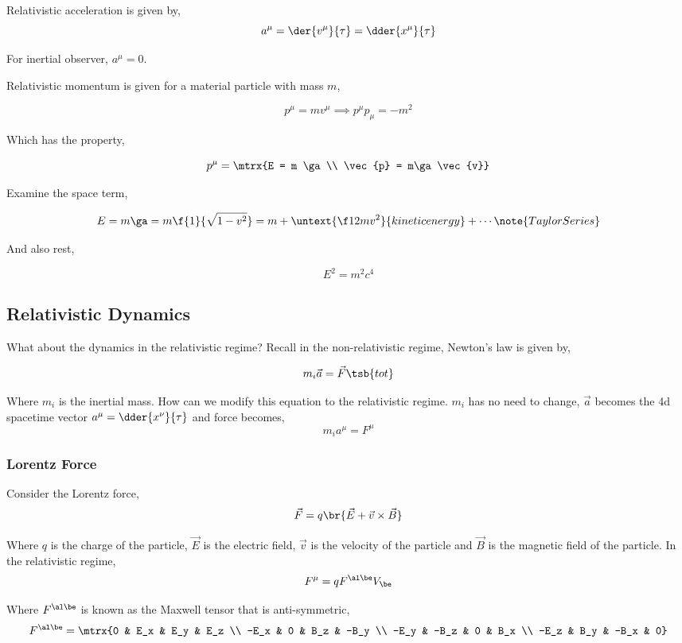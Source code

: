 \documentclass{article}
\begin{document}
Relativistic acceleration is given by,
\[ a^\mu = \der{v^\mu}{\tau} = \dder{x^\mu}{\tau} \]

For inertial observer, $a^\mu = 0$.

Relativistic momentum is given for a material particle with mass $m$,

\[ p^\mu = m v^\mu \implies p^\mu p_\mu = - m^2\]

Which has the property,

\[ p^\mu = \mtrx{E = m \ga \\ \vec{p} = m\ga \vec{v}} \]

Examine the space term,

\[ E = m \ga = m \f{1}{\sqrt{1-v^2}} = m + \untext{\f12 m v^2}{kinetic energy} + \cdots \note{Taylor Series} \]

And also rest,

\[ E^2 = m^2 c^4 \]

\subsection{Relativistic Dynamics}

What about the dynamics in the relativistic regime? Recall in the non-relativistic regime, Newton's law is given by,

\[ m_i \vec{a} = \vec{F}\tsb{tot} \]

Where $m_i$ is the inertial mass. How can we modify this equation to the relativistic regime. $m_i$ has no need to change, $\vec{a}$ becomes the 4d spacetime vector $a^\mu = \dder{x^\nu}{\tau}$ and force becomes,
\[ m_i a^\mu = F^\mu \]

\subsubsection{Lorentz Force}

Consider the Lorentz force,
\[ \vec{F} = q \br{\vec{E} + \vec{v} \times \vec{B}} \]

Where $q$ is the charge of the particle, $\vec{E}$ is the electric field, $\vec{v}$ is the velocity of the particle and $\vec{B}$ is the magnetic field of the particle. In the relativistic regime,
\[ F^\mu = q {F^{\al\be}} V_\be \]

Where $F^{\al\be}$ is known as the Maxwell tensor that is anti-symmetric,
\[ F^{\al\be} = \mtrx{0 & E_x & E_y & E_z \\ -E_x & 0 & B_z & -B_y \\ -E_y & -B_z & 0 & B_x \\ -E_z & B_y & -B_x & 0} \]
\end{document}
